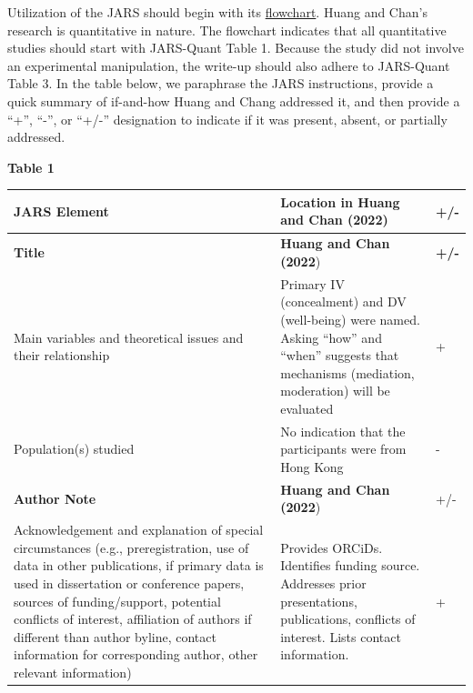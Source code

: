 \documentclass[
  11pt,
]{book}
\begin{document}
Utilization of the JARS should begin with its \href{https://apastyle.apa.org/jars/jars-quant-decision-flowchart.pdf}{flowchart}. Huang and Chan's \citeyearpar{huang_effects_2022} research is quantitative in nature. The flowchart indicates that all quantitative studies should start with JARS-Quant Table 1. Because the study did not involve an experimental manipulation, the write-up should also adhere to JARS-Quant Table 3. In the table below, we paraphrase the JARS instructions, provide a quick summary of if-and-how Huang and Chang addressed it, and then provide a ``+'', ``-'', or ``+/-'' designation to indicate if it was present, absent, or partially addressed.

\textbf{Table 1}

\begin{longtable}[]{@{}
  >{\raggedright\arraybackslash}p{}
  >{\raggedright\arraybackslash}p{}
  >{\centering\arraybackslash}p{}@{}}
\toprule\noalign{}
\begin{minipage}[b]{\linewidth}\raggedright
JARS Element
\end{minipage} & \begin{minipage}[b]{\linewidth}\raggedright
Location in Huang and Chan (2022)
\end{minipage} & \begin{minipage}[b]{\linewidth}\centering
+/-
\end{minipage} \\
\midrule\noalign{}
\endhead
\bottomrule\noalign{}
\endlastfoot
\textbf{Title} & \textbf{Huang and Chan (2022}) & \textbf{+/-} \\
Main variables and theoretical issues and their relationship & Primary IV (concealment) and DV (well-being) were named. Asking ``how'' and ``when'' suggests that mechanisms (mediation, moderation) will be evaluated & + \\
Population(s) studied & No indication that the participants were from Hong Kong & - \\
\textbf{Author Note} & \textbf{Huang and Chan (2022}) & +/- \\
Acknowledgement and explanation of special circumstances (e.g., preregistration, use of data in other publications, if primary data is used in dissertation or conference papers, sources of funding/support, potential conflicts of interest, affiliation of authors if different than author byline, contact information for corresponding author, other relevant information) & Provides ORCiDs. Identifies funding source. Addresses prior presentations, publications, conflicts of interest. Lists contact information. & + \\

\end{longtable}
\end{document}
